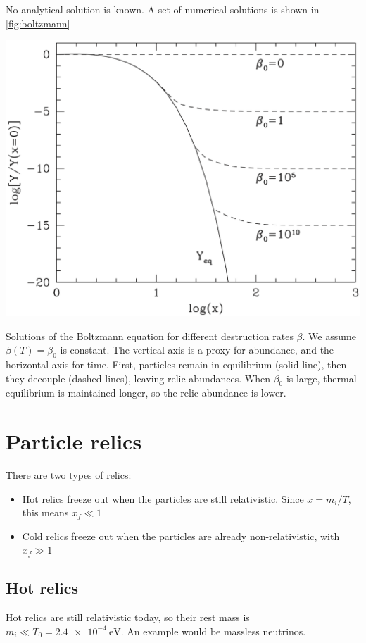 No analytical solution is known. A set of numerical solutions is shown in \cref{fig:boltzmann}

\begin{marginfigure}
	\centering
	\includegraphics[width=\textwidth]{img/ch-02/boltzmann.png}
	\caption{Solutions of the Boltzmann equation for different destruction rates $\beta$. We assume $\beta(T) = \beta_0$ is constant. The vertical axis is a proxy for abundance, and the horizontal axis for time. First, particles remain in equilibrium (solid line), then they decouple (dashed lines), leaving relic abundances. When $\beta_0$ is large, thermal equilibrium is maintained longer, so the relic abundance is lower.}
	\label{fig:boltzmann}
\end{marginfigure}


\section{Particle relics}
There are two types of relics:
\begin{itemize}
	\item Hot relics freeze out when the particles are still relativistic. Since $x = m_i / T$, this means $x_f \ll 1$
	\item Cold relics freeze out when the particles are already non-relativistic, with $x_f \gg 1$
\end{itemize}

\subsection{Hot relics}
Hot relics are still relativistic today, so their rest mass is $m_i \ll T_0 = \SI{2.4e-4}{\eV}$. An example would be massless neutrinos.

